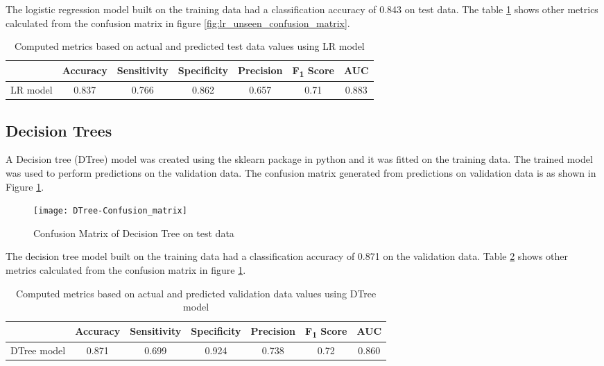 \documentclass[11pt,openright]{report}
\begin{document}
The logistic regression model built on the training data had a classification accuracy of 0.843 on test data. The table \ref{table:lr-unseen_metrics_db} shows other metrics calculated from the confusion matrix in figure \ref{fig:lr_unseen_confusion_matrix}.

\begin{table}[!htb]
	\renewcommand{\arraystretch}{1.3}
	\caption{Computed metrics based on actual and predicted test data values using LR model}
	\label{table:lr-unseen_metrics_db}
	\centering
	\begin{tabular}{|c|c|c|c|c|c|c|}
    \hline
  	 & \bfseries Accuracy & \bfseries Sensitivity & \bfseries Specificity & \bfseries Precision & \bfseries F\textsubscript{1} Score  & \bfseries AUC\\  
    \hline
	LR model & 0.837 & 0.766 & 0.862 & 0.657 & 0.71 & 0.883 \\ \hline
	\end{tabular} 
\end{table}

\subsection {Decision Trees}
A Decision tree (DTree) model was created using the sklearn package in python and it was fitted on the training data. The trained model was used to perform predictions on the validation data. The confusion matrix generated from predictions on validation data is as shown in Figure \ref{fig:Dtree_confusion_matrix}.

  \begin{figure}[!htb]
	\centering
	\texttt{[image: DTree-Confusion\_matrix]}
	\caption{Confusion Matrix of Decision Tree on test data}
	\label{fig:Dtree_confusion_matrix}
\end{figure} 

The decision tree model built on the training data had a classification accuracy of 0.871 on the validation data. Table \ref{table:Dtree_confusion_matrix} shows other metrics calculated from the confusion matrix in figure \ref{fig:Dtree_confusion_matrix}. 

\begin{table} [!htb]
	\renewcommand{\arraystretch}{1.3}
	\caption{Computed metrics based on actual and predicted validation data values using DTree model}
	\label{table:Dtree_confusion_matrix}
	\centering
	\begin{tabular}{|c|c|c|c|c|c|c|}
    \hline
  	 & \bfseries Accuracy & \bfseries Sensitivity & \bfseries Specificity & \bfseries Precision & \bfseries F\textsubscript{1} Score  & \bfseries AUC\\  
    \hline
	DTree model & 0.871 & 0.699 & 0.924 & 0.738 & 0.72 & 0.860 \\ \hline
	\end{tabular} 
\end{table}
\end{document}
